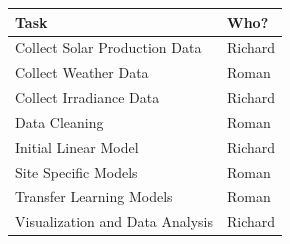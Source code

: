 \documentclass[11pt, fullpage,letterpaper]{article}
\begin{document}
\begin{center}
\begin{tabular}{|l|l|}
    \hline
    Task & Who?\\
    \hline
    Collect Solar Production Data & Richard \\
    \hline
    Collect Weather Data & Roman \\
    \hline
    Collect Irradiance Data & Richard \\
    \hline
    Data Cleaning & Roman \\
    \hline
    Initial Linear Model & Richard \\
    \hline
    Site Specific Models & Roman \\
    \hline
    Transfer Learning Models & Roman \\
    \hline
    Visualization and Data Analysis & Richard \\
    \hline
\end{tabular}
\end{center}
\end{document}
